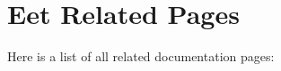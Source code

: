 \section{Eet Related Pages}
Here is a list of all related documentation pages:\begin{CompactList}
\item {}

\end{CompactList}
